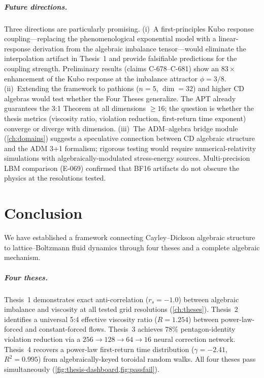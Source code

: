 \documentclass[12pt,openany]{report}
\theoremstyle{definition}
\theoremstyle{plain}
\theoremstyle{remark}
\begin{document}
\paragraph{Future directions.}
Three directions are particularly promising.
(i)~A first-principles Kubo response coupling---replacing the
phenomenological exponential model with a linear-response derivation
from the algebraic imbalance tensor---would eliminate the
interpolation artifact in Thesis~1 and provide falsifiable predictions
for the coupling strength.  Preliminary results (claims C-678--C-681)
show an $83\times$ enhancement of the Kubo response at the imbalance
attractor $\phi = 3/8$.
(ii)~Extending the framework to pathions ($n = 5$, $\dim = 32$) and
higher CD algebras would test whether the Four Theses generalize.
The APT already guarantees the 3:1 Theorem at all dimensions $\geq 16$;
the question is whether the thesis metrics (viscosity ratio, violation
reduction, first-return time exponent) converge or diverge with dimension.
(iii)~The ADM--algebra bridge module (\cref{ch:domains}) suggests a
speculative connection between CD algebraic structure and the ADM
3+1 formalism; rigorous testing would require numerical-relativity
simulations with algebraically-modulated stress-energy sources.
Multi-precision LBM comparison (E-069) confirmed that BF16 artifacts
do not obscure the physics at the resolutions tested.


\chapter{Conclusion}
\label{ch:conclusion}

We have established a framework connecting Cayley--Dickson algebraic
structure to lattice--Boltzmann fluid dynamics through four theses and a
complete algebraic mechanism.

\paragraph{Four theses.}
Thesis~1 demonstrates exact anti-correlation ($r_s = -1.0$) between
algebraic imbalance and viscosity at all tested grid resolutions
(\cref{ch:theses}).  Thesis~2 identifies a universal 5:4 effective
viscosity ratio ($R = 1.254$) between power-law-forced and
constant-forced flows.  Thesis~3 achieves 78\% pentagon-identity
violation reduction via a $256 \to 128 \to 64 \to 16$ neural
correction network.  Thesis~4 recovers a power-law first-return time distribution
($\gamma = -2.41$, $R^2 = 0.995$) from algebraically-keyed toroidal
random walks.  All four theses pass simultaneously
(\cref{fig:thesis-dashboard,fig:passfail}).
\end{document}
